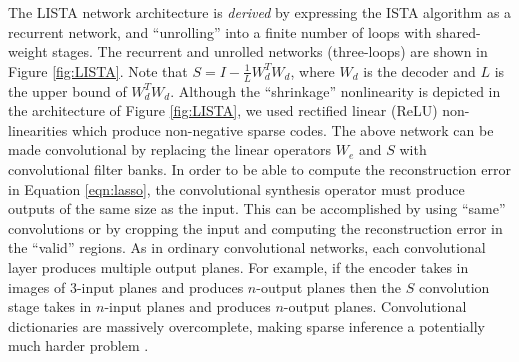 The LISTA network architecture is \emph{derived} by expressing the ISTA
algorithm as a recurrent network, and ``unrolling'' into a finite number of
loops with shared-weight stages.  The recurrent and unrolled networks
(three-loops) are shown in Figure \ref{fig:LISTA}. Note that
$S=I-\frac{1}{L}W_d^T W_d$, where $W_d$ is the decoder and $L$ is the upper
bound of $W_d^T W_d$. Although the ``shrinkage'' nonlinearity is depicted in
the architecture of Figure \ref{fig:LISTA}, we used rectified linear (ReLU)
non-linearities which produce non-negative sparse codes.  The above network can
be made convolutional by replacing the linear operators $W_e$ and $S$ with
convolutional filter banks. In order to be able to compute the reconstruction
error in Equation \ref{eqn:lasso}, the convolutional synthesis operator must
produce outputs of the same size as the input. This can be accomplished by
using ``same'' convolutions or by cropping the input and computing the
reconstruction error in the ``valid'' regions. As in ordinary convolutional
networks, each convolutional layer produces multiple output planes. For
example, if the encoder takes in images of 3-input planes and produces
$n$-output planes then the $S$ convolution stage takes in $n$-input planes and
produces $n$-output planes. Convolutional dictionaries are massively
overcomplete, making sparse inference a potentially much harder problem
\cite{ConvSC}. 

